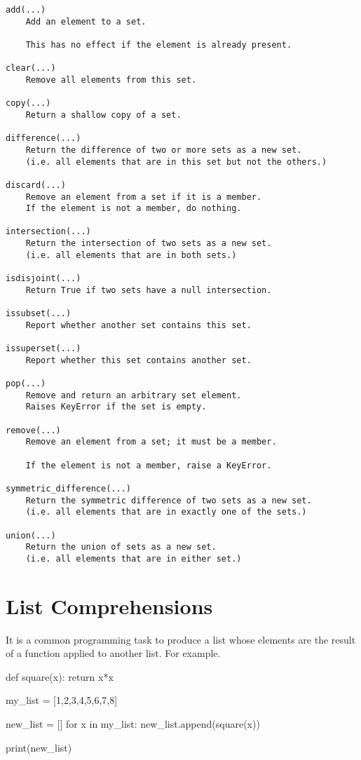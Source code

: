 \documentclass[12pt,letterpaper,twoside]{article}
\begin{document}
{
\footnotesize
\begin{verbatim}
add(...)
    Add an element to a set.

    This has no effect if the element is already present.

clear(...)
    Remove all elements from this set.

copy(...)
    Return a shallow copy of a set.

difference(...)
    Return the difference of two or more sets as a new set.
    (i.e. all elements that are in this set but not the others.)

discard(...)
    Remove an element from a set if it is a member.
    If the element is not a member, do nothing.

intersection(...)
    Return the intersection of two sets as a new set.
    (i.e. all elements that are in both sets.)

isdisjoint(...)
    Return True if two sets have a null intersection.

issubset(...)
    Report whether another set contains this set.

issuperset(...)
    Report whether this set contains another set.

pop(...)
    Remove and return an arbitrary set element.
    Raises KeyError if the set is empty.

remove(...)
    Remove an element from a set; it must be a member.

    If the element is not a member, raise a KeyError.

symmetric_difference(...)
    Return the symmetric difference of two sets as a new set.
    (i.e. all elements that are in exactly one of the sets.)

union(...)
    Return the union of sets as a new set.
    (i.e. all elements that are in either set.)

\end{verbatim}
}

\section{List Comprehensions}
It is a common programming task to produce a list whose elements are the
result of a function applied to another list. For example.

\begin{python}
def square(x):
    return x*x

my_list = [1,2,3,4,5,6,7,8]

new_list = []
for x in my_list:
    new_list.append(square(x))

print(new_list)
\end{python}
\end{document}
